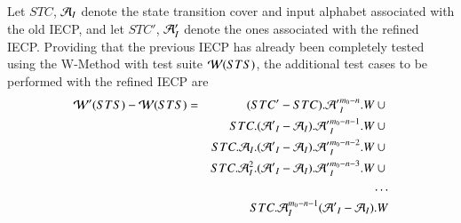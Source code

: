 Let $STC$, ${\cal A}_I$ denote the state transition cover and input alphabet associated with the old IECP, and let $STC'$, ${\cal A}_I'$ denote the ones associated with the refined IECP.
Providing that the previous IECP has already been completely tested using the W-Method with test suite ${\cal W}(STS)$, 
the additional test cases to be performed with the refined IECP are
\begin{eqnarray*}
{\cal W}'(STS) - {\cal W}(STS) & = & (STC'-STC).{{\cal A}'}_I^{m_0-n}.W \cup {}
\\ & & STC.({{\cal A}'}_I-{\cal A}_I).{{\cal A}'}_I^{m_0-n-1}.W \cup {}
\\ & &   STC.{\cal A}_I.({{\cal A}'}_I-{\cal A}_I).{{\cal A}'}_I^{m_0-n-2}.W \cup {}
\\ & & STC.{\cal A}_I^2.({{\cal A}'}_I-{\cal A}_I).{{\cal A}'}_I^{m_0-n-3}.W \cup {}
\\ & & \dots
\\ & & STC.{\cal A}_I^{m_0-n-1}({{\cal A}'}_I-{\cal A}_I).W
\end{eqnarray*}














 




 
